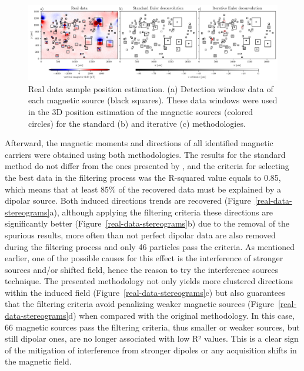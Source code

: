 \begin{figure}[tb!]
  \centering
  \includegraphics[width=1\linewidth]{paper/figures/euler-comparion-real.png}
  \caption{Real data sample position estimation. (a) Detection window data of each magnetic source (black squares). These data windows were used in the 3D position estimation of the magnetic sources (colored circles) for the standard (b) and iterative (c) methodologies. }
  \label{real-data-euler}
\end{figure}

Afterward, the magnetic moments and directions of all identified magnetic carriers were obtained using both methodologies. The results for the standard method do not differ from the ones presented by \citet{Souza-Junior2023b}, and the criteria for selecting the best data in the filtering process was the R-squared value \citep[similar to the dipolarity parameter,][]{Fu2020} equals to 0.85, which means that at least 85\% of the recovered data must be explained by a dipolar source. Both induced directions trends are recovered (Figure~\ref{real-data-stereograms}a), although applying the filtering criteria these directions are significantly better (Figure~\ref{real-data-stereograms}b) due to the removal of the spurious results, more often than not perfect dipolar data are also removed during the filtering process and only 46 particles pass the criteria. As mentioned earlier, one of the possible causes for this effect is the interference of stronger sources and/or shifted field, hence the reason to try the interference sources technique. The presented methodology not only yields more clustered directions within the induced field (Figure~\ref{real-data-stereograms}c) but also guarantees that the filtering criteria avoid penalizing weaker magnetic sources (Figure~\ref{real-data-stereograms}d) when compared with the original methodology. In this case, 66 magnetic sources pass the filtering criteria, thus smaller or weaker sources, but still dipolar ones, are no longer associated with low R² values. This is a clear sign of the mitigation of interference from stronger dipoles or any acquisition shifts in the magnetic field.  


